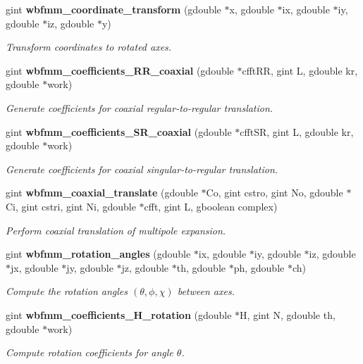 \begin{DoxyCompactItemize}
gint \textbf{ wbfmm\+\_\+coordinate\+\_\+transform} (gdouble $\ast$x, gdouble $\ast$ix, gdouble $\ast$iy, gdouble $\ast$iz, gdouble $\ast$y)
\begin{DoxyCompactList}\small\item\em Transform coordinates to rotated axes. \end{DoxyCompactList}\item 
gint \textbf{ wbfmm\+\_\+coefficients\+\_\+\+R\+R\+\_\+coaxial} (gdouble $\ast$cfft\+RR, gint L, gdouble kr, gdouble $\ast$work)
\begin{DoxyCompactList}\small\item\em Generate coefficients for coaxial regular-\/to-\/regular translation. \end{DoxyCompactList}\item 
gint \textbf{ wbfmm\+\_\+coefficients\+\_\+\+S\+R\+\_\+coaxial} (gdouble $\ast$cfft\+SR, gint L, gdouble kr, gdouble $\ast$work)
\begin{DoxyCompactList}\small\item\em Generate coefficients for coaxial singular-\/to-\/regular translation. \end{DoxyCompactList}\item 
gint \textbf{ wbfmm\+\_\+coaxial\+\_\+translate} (gdouble $\ast$Co, gint cstro, gint No, gdouble $\ast$Ci, gint cstri, gint Ni, gdouble $\ast$cfft, gint L, gboolean complex)
\begin{DoxyCompactList}\small\item\em Perform coaxial translation of multipole expansion. \end{DoxyCompactList}\item 
gint \textbf{ wbfmm\+\_\+rotation\+\_\+angles} (gdouble $\ast$ix, gdouble $\ast$iy, gdouble $\ast$iz, gdouble $\ast$jx, gdouble $\ast$jy, gdouble $\ast$jz, gdouble $\ast$th, gdouble $\ast$ph, gdouble $\ast$ch)
\begin{DoxyCompactList}\small\item\em Compute the rotation angles $(\theta,\phi,\chi)$ between axes. \end{DoxyCompactList}\item 
gint \textbf{ wbfmm\+\_\+coefficients\+\_\+\+H\+\_\+rotation} (gdouble $\ast$H, gint N, gdouble th, gdouble $\ast$work)
\begin{DoxyCompactList}\small\item\em Compute rotation coefficients for angle $\theta$. \end{DoxyCompactList}\item 

\end{DoxyCompactItemize}
